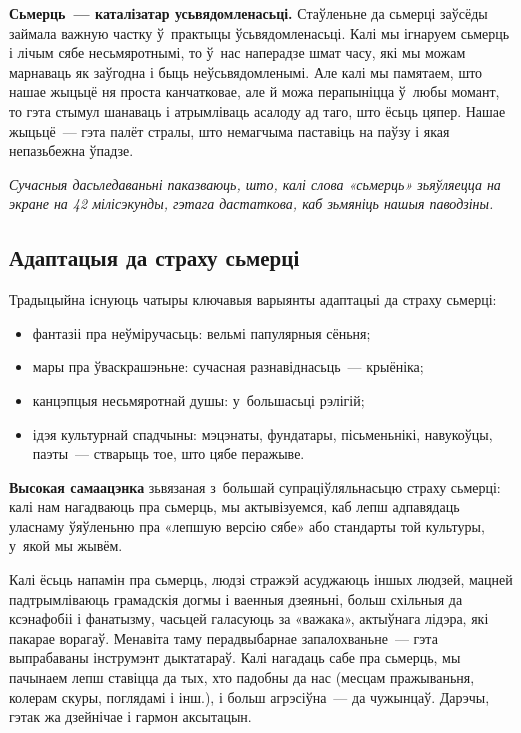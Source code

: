 \textbf{Сьмерць~--- каталізатар усьвядомленасьці.} Стаўленьне да сьмерці заўсёды займала важную частку ў~практыцы ўсьвядомленасьці. Калі мы ігнаруем сьмерць і лічым сябе несьмяротнымі, то ў~нас наперадзе шмат часу, які мы можам марнаваць як заўгодна і быць неўсьвядомленымі. Але калі мы памятаем, што нашае жыцьцё ня проста канчатковае, але й можа перапыніцца ў~любы момант, то гэта стымул шанаваць і атрымліваць асалоду ад таго, што ёсьць цяпер. Нашае жыцьцё~--- гэта палёт стралы, што немагчыма паставіць на паўзу і якая непазьбежна ўпадзе.

\emph{Сучасныя дасьледаваньні паказваюць, што, калі слова «сьмерць» зьяўляецца на экране на 42 мілісэкунды, гэтага дастаткова, каб зьмяніць нашыя паводзіны.} 

\subsection*{Адаптацыя да страху сьмерці}

Традыцыйна існуюць чатыры ключавыя варыянты адаптацыі да страху сьмерці: 
\begin{itemize}
  \item фантазіі пра неўміручасьць: вельмі папулярныя сёньня;
  \item мары пра ўваскрашэньне: сучасная разнавіднасьць~--- крыёніка;
  \item канцэпцыя несьмяротнай душы: у~большасьці рэлігій;
  \item ідэя культурнай спадчыны: мэцэнаты, фундатары, пісьменьнікі, навукоўцы, паэты~--- стварыць тое, што цябе перажыве.
\end{itemize}

\textbf{Высокая самаацэнка} зьвязаная з~большай супраціўляльнасьцю страху сьмерці: калі нам нагадваюць пра сьмерць, мы актывізуемся, каб лепш адпавядаць уласнаму ўяўленьню пра «лепшую версію сябе» або стандарты той культуры, у~якой мы жывём.

Калі ёсьць напамін пра сьмерць, людзі стражэй асуджаюць іншых людзей, мацней падтрымліваюць грамадскія догмы і ваенныя дзеяньні, больш схільныя да ксэнафобіі і фанатызму, часьцей галасуюць за «важака», актыўнага лідэра, які пакарае ворагаў. Менавіта таму перадвыбарнае запалохваньне~--- гэта выпрабаваны інструмэнт дыктатараў. Калі нагадаць сабе пра сьмерць, мы пачынаем лепш ставіцца да тых, хто падобны да нас (месцам пражываньня, колерам скуры, поглядамі і інш.), і больш агрэсіўна~--- да чужынцаў. Дарэчы, гэтак жа дзейнічае і гармон аксытацын. 

